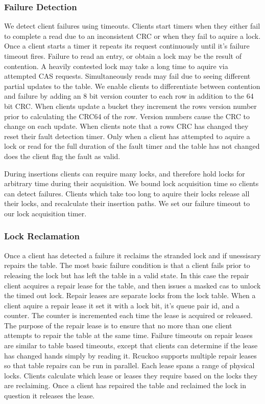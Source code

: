 \subsubsection{Failure Detection} We detect client failures
using timeouts. Clients start timers when they either fail
to complete a read due to an inconsistent CRC or when they
fail to aquire a lock. Once a client starts a timer it
repeats its request continuously until it's failure timeout
fires. Failure to read an entry, or obtain a lock may be the
result of contention. A heavily contested lock may take a
long time to aquire via attempted CAS requests.
Simultaneously reads may fail due to seeing different
partial updates to the table. We enable clients to
differentiate between contention and failure by adding an 8
bit version counter to each row in addition to the 64 bit
CRC. When clients update a bucket they increment the rows
version number prior to calculating the CRC64 of the row.
Version numbers cause the CRC to change on each update. When
clients note that a rows CRC has changed they reset their
fault detection timer. Only when a client has attempted to
aquire a lock or read for the full duration of the fault
timer and the table has not changed does the client flag the
fault as valid.

During insertions clients can require many locks, and
therefore hold locks for arbitrary time during their
acquisition. We bound lock acquisition time so clients can
detect failures. Clients which take too long to aquire their
locks release all their locks, and recalculate their
insertion paths.  We set our failure timeout to  our lock acquisition timer.

\subsubsection{Lock Reclamation} Once a client has detected
a failure it reclaims the stranded lock and if unessisary
repairs the table. The most basic failure condition is that
a client fails prior to releasing the lock but has left the
table in a valid state. In this case the repair client
acquires a repair lease for the table, and then issues a
masked cas to unlock the timed out lock. Repair leases are
separate locks from the lock table. When a client aquire a
repair lease it set it with a lock bit, it's queue pair id,
and a counter. The counter is incremented each time the
lease is acquired or released. The purpose of the repair
lease is to ensure that no more than one client attempts to
repair the table at the same time. Failure timeouts on
repair leases are similar to table based timeouts, except
that clients can determine if the lease has changed hands
simply by reading it. Rcuckoo supports multiple repair
leases so that table repairs can be run in parallel. Each
lease spans a range of physical locks. Clients calculate
which lease or leases they require based on the locks they
are reclaiming. Once a client has repaired the table and
reclaimed the lock in question it releases the lease.

